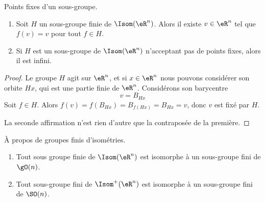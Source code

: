 \begin{proposition}     \label{PROPooLAEBooWdcBoe}
    Points fixes d'un sous-groupe.
    \begin{enumerate}
        \item
            Soit \( H\) un sous-groupe finie de \( \Isom(\eR^n)\). Alors il existe \( v\in \eR^n\) tel que \( f(v)=v\) pour tout \( f\in H\).
        \item
            Si \( H\) est un sous-groupe de \( \Isom(\eR^n)\) n'acceptant pas de points fixes, alors il est infini.
    \end{enumerate}
\end{proposition}

\begin{proof}
    Le groupe \( H\) agit sur \( \eR^n\), et si \( x\in \eR^n\) nous pouvons considérer son orbite \( Hx\), qui est une partie finie de \( \eR^n\). Considérons son barycentre
    \begin{equation}
        v=B_{Hx}
    \end{equation}
    Soit \( f\in H\). Alors \( f(v)=f(B_{Hx})=B_{f(Hx)}=B_{Hx}=v\), donc \( v\) est fixé par \( H\).

    La seconde affirmation n'est rien d'autre que la contraposée de la première.
\end{proof}

\begin{proposition}     \label{PROPooEUFIooDUIYzi}
    À propos de groupes finis d'isométries.
    \begin{enumerate}
        \item
            Tout sous groupe finie de \( \Isom(\eR^n)\) est isomorphe à un sous-groupe fini de \( \gO(n)\).
        \item
            Tout sous-groupe fini de \( \Isom^+(\eR^n)\) est isomorphe à un sous-groupe fini de \( \SO(n)\).
    \end{enumerate}
\end{proposition}


